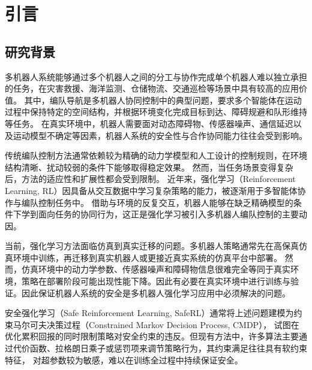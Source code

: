 \chapter{引言}

\section{研究背景}

多机器人系统能够通过多个机器人之间的分工与协作完成单个机器人难以独立承担的任务，在灾害救援、海洋监测、仓储物流、交通巡检等场景中具有较高的应用价值。
其中，编队导航是多机器人协同控制中的典型问题，要求多个智能体在运动过程中保持特定的空间结构，并根据环境变化完成目标到达、障碍规避和队形维持等任务\cite{rawat2020multi,orr2023marl_multirobot_survey}。
在真实环境中，机器人需要面对动态障碍物、传感器噪声、通信延迟以及运动模型不确定等因素，机器人系统的安全性与合作协同能力往往会受到影响。

传统编队控制方法通常依赖较为精确的动力学模型和人工设计的控制规则，在环境结构清晰、扰动较弱的条件下能够取得稳定效果。
然而，当任务场景变得复杂后，方法的适应性和扩展性都会受到限制。
近年来，强化学习（Reinforcement Learning, RL）因具备从交互数据中学习复杂策略的能力，被逐渐用于多智能体协作与编队控制任务中\cite{罗彪2025多智能体强化学习控制与决策研究综述,gronauer2022multiagent_survey,yu2022surprising_mappo}。
借助与环境的反复交互，机器人能够在缺乏精确模型的条件下学到面向任务的协同行为，这正是强化学习被引入多机器人编队控制的主要动因。

当前，强化学习方法面临仿真到真实迁移的问题。多机器人策略通常先在高保真仿真环境中训练，再迁移到真实机器人或更接近真实系统的仿真平台中部署。
然而，仿真环境中的动力学参数、传感器噪声和障碍物信息很难完全等同于真实环境，策略在部署阶段可能出现性能下降。因此有必要在真实环境中进行训练与验证。因此保证机器人系统的安全是多机器人强化学习应用中必须解决的问题。


安全强化学习（Safe Reinforcement Learning, SafeRL）通常将上述问题建模为约束马尔可夫决策过程（Constrained Markov Decision Process, CMDP），
试图在优化累积回报的同时限制策略对安全约束的违反。但现有方法中，许多算法主要通过代价函数、拉格朗日乘子或惩罚项来调节策略行为，其约束满足往往具有软约束特征，
对超参数较为敏感，难以在训练全过程中持续保证安全\cite{gu2024review,zhao2023statewise_safe_survey,ray2019benchmarking,ji2024omnisafe,hsu2024safety_filter}。

